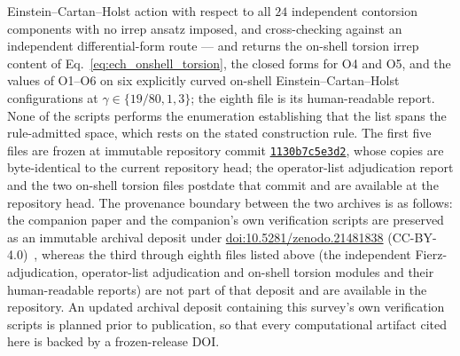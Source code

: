 \documentclass[aps,prd,twocolumn,superscriptaddress,showpacs,preprintnumbers,nofootinbib,longbibliography,floatfix]{revtex4-2}
\begin{document}
Einstein--Cartan--Holst action with respect to all $24$ independent
contorsion components with no irrep ansatz imposed, and cross-checking
against an independent differential-form route --- and returns the
on-shell torsion irrep content of
Eq.~\eqref{eq:ech_onshell_torsion}, the closed forms for O4 and O5, and
the values of O1--O6 on six explicitly curved on-shell
Einstein--Cartan--Holst configurations at $\gamma\in\{19/80,1,3\}$; the
eighth file is its human-readable report.
None of
the scripts performs the enumeration establishing that the list spans the
rule-admitted space, which rests on the stated
construction rule. The first five files are frozen at immutable
repository commit
\href{https://github.com/Hubify-Projects/bigbounce/tree/1130b7c5e3d217816694762d888be33fb4605bf0}{\texttt{1130b7c5e3d2}},
whose copies are byte-identical to the current repository
head; the operator-list adjudication report and the two on-shell torsion
files postdate that commit and are available at the repository head.
The provenance boundary between the two archives is as follows: the
companion paper and the companion's own verification scripts are
preserved as an immutable archival deposit under
\href{https://doi.org/10.5281/zenodo.21481838}{doi:10.5281/zenodo.21481838}
(CC-BY-4.0)~\cite{Golden2026P1a}, whereas the third through eighth files
listed above (the independent Fierz-adjudication, operator-list
adjudication and on-shell torsion modules and their
human-readable reports) are not part of that deposit and are available in
the repository. An
updated archival deposit containing this survey's own verification
scripts is planned prior to publication, so that every computational
artifact cited here is backed by a frozen-release DOI.
\end{document}
